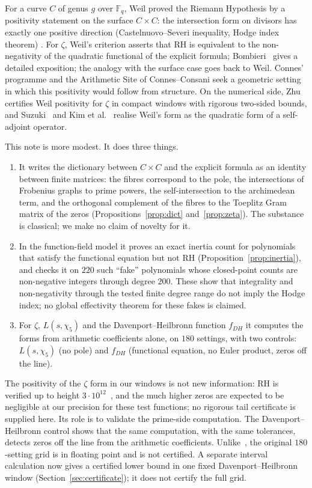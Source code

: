 \documentclass[11pt]{amsart}
\theoremstyle{remark}
\theoremstyle{definition}
\newcommand{\F}{\mathbb F}
\begin{document}
For a curve $C$ of genus $g$ over $\F_q$, Weil proved the Riemann Hypothesis by a positivity statement on the surface $C\times C$: the intersection form on divisors has exactly one positive direction (Castelnuovo--Severi inequality, Hodge index theorem) \cite{Wei48}. For $\zeta$, Weil's criterion \cite{Wei52} asserts that RH is equivalent to the non-negativity of the quadratic functional of the explicit formula; Bombieri~\cite{Bom00} gives a detailed exposition; the analogy with the surface case goes back to Weil. Connes' programme \cite{Con99,CCM25,CvS25} and the Arithmetic Site of Connes--Consani \cite{CC14} seek a geometric setting in which this positivity would follow from structure. On the numerical side, Zhu~\cite{Zhu26} certifies Weil positivity for $\zeta$ in compact windows with rigorous two-sided bounds, and Suzuki~\cite{Suz26} and Kim et al.~\cite{Kim26} realise Weil's form as the quadratic form of a self-adjoint operator.

This note is more modest. It does three things.
\begin{enumerate}
\item It writes the dictionary between $C\times C$ and the explicit formula as an identity between finite matrices: the fibres correspond to the pole, the intersections of Frobenius graphs to prime powers, the self-intersection to the archimedean term, and the orthogonal complement of the fibres to the Toeplitz Gram matrix of the zeros (Propositions~\ref{prop:dict} and~\ref{prop:zeta}). The substance is classical; we make no claim of novelty for it.
\item In the function-field model it proves an exact inertia count for polynomials that satisfy the functional equation but not RH (Proposition~\ref{prop:inertia}), and checks it on $220$ such ``fake'' polynomials whose closed-point counts are non-negative integers through degree $200$. These show that integrality and non-negativity through the tested finite degree range do not imply the Hodge index; no global effectivity theorem for these fakes is claimed.
\item For $\zeta$, $L(s,\chi_5)$ and the Davenport--Heilbronn function $f_{DH}$ it computes the forms from arithmetic coefficients alone, on $180$ settings, with two controls: $L(s,\chi_5)$ (no pole) and $f_{DH}$ (functional equation, no Euler product, zeros off the line).
\end{enumerate}
The positivity of the $\zeta$ form in our windows is not new information: RH is verified up to height $3\cdot10^{12}$~\cite{PT21}, and the much higher zeros are expected to be negligible at our precision for these test functions; no rigorous tail certificate is supplied here. Its role is to validate the prime-side computation. The Davenport--Heilbronn control shows that the same computation, with the same tolerances, detects zeros off the line from the arithmetic coefficients. Unlike~\cite{Zhu26}, the original $180$-setting grid is in floating point and is not certified. A separate interval calculation now gives a certified lower bound in one fixed Davenport--Heilbronn window (Section~\ref{sec:certificate}); it does not certify the full grid.
\end{document}
